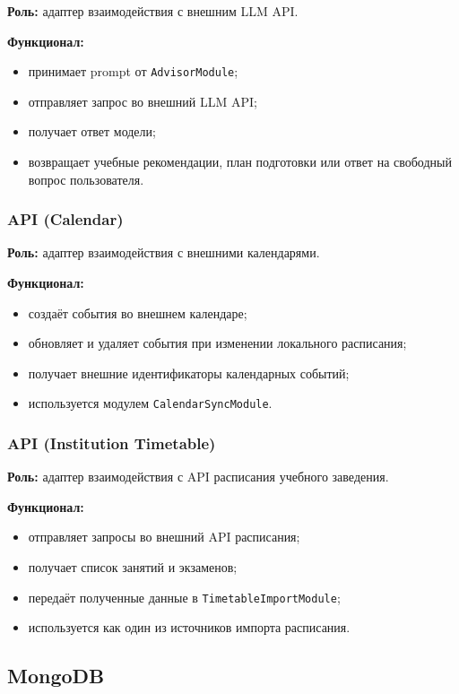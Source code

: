 \documentclass[10pt,a4paper,final]{article} %
\begin{document}
\textbf{Роль:} адаптер взаимодействия с внешним LLM API.

\textbf{Функционал:}
\begin{itemize}
    \item принимает prompt от \texttt{AdvisorModule};
    \item отправляет запрос во внешний LLM API;
    \item получает ответ модели;
    \item возвращает учебные рекомендации, план подготовки или ответ на
    свободный вопрос пользователя.
\end{itemize}

\subsubsection{API (Calendar)}

\textbf{Роль:} адаптер взаимодействия с внешними календарями.

\textbf{Функционал:}
\begin{itemize}
    \item создаёт события во внешнем календаре;
    \item обновляет и удаляет события при изменении локального расписания;
    \item получает внешние идентификаторы календарных событий;
    \item используется модулем \texttt{CalendarSyncModule}.
\end{itemize}

\subsubsection{API (Institution Timetable)}

\textbf{Роль:} адаптер взаимодействия с API расписания учебного заведения.

\textbf{Функционал:}
\begin{itemize}
    \item отправляет запросы во внешний API расписания;
    \item получает список занятий и экзаменов;
    \item передаёт полученные данные в \texttt{TimetableImportModule};
    \item используется как один из источников импорта расписания.
\end{itemize}

\subsection{MongoDB}
\end{document}
